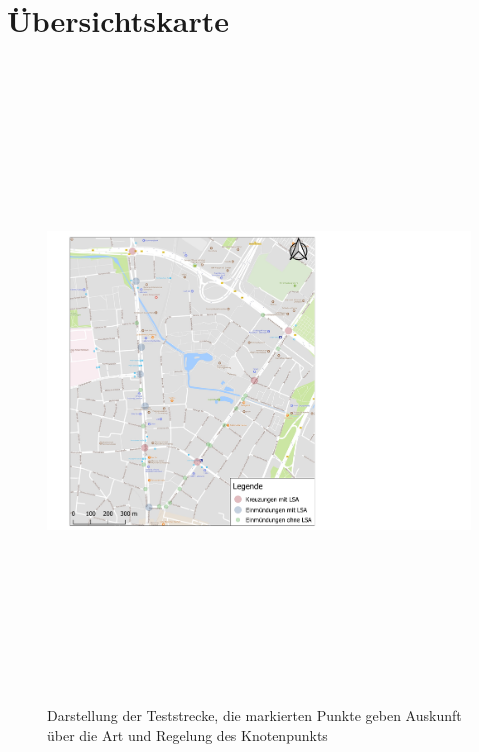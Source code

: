 
\chapter{Übersichtskarte}\label{chapter:Übersichtskarten}


\begin{savenotes}
	\begin{figure}[H]
		\centering
		\includegraphics[width=21.5cm,height=17cm]{figures/Markante_Punkte}
		\caption[Darstellung der Teststrecke, die markierten Punkte geben Auskunft über die Art und Regelung des Knotenpunkts]{Darstellung der Teststrecke, die markierten Punkte geben Auskunft über die Art und Regelung des Knotenpunkts}\label{fig:Knoten_Testgebiet}
	\end{figure}
\end{savenotes}